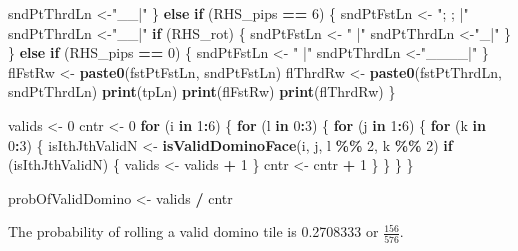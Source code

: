 \documentclass[
]{article}
\newenvironment{Shaded}{\begin{snugshade}}{\end{snugshade}}
\newcommand{\ControlFlowTok}[1]{\textcolor[rgb]{0.13,0.29,0.53}{\textbf{#1}}}
\newcommand{\DecValTok}[1]{\textcolor[rgb]{0.00,0.00,0.81}{#1}}
\newcommand{\FunctionTok}[1]{\textcolor[rgb]{0.13,0.29,0.53}{\textbf{#1}}}
\newcommand{\NormalTok}[1]{#1}
\newcommand{\OtherTok}[1]{\textcolor[rgb]{0.56,0.35,0.01}{#1}}
\newcommand{\SpecialCharTok}[1]{\textcolor[rgb]{0.81,0.36,0.00}{\textbf{#1}}}
\newcommand{\StringTok}[1]{\textcolor[rgb]{0.31,0.60,0.02}{#1}}
\begin{document}
\begin{Shaded}
\begin{Highlighting}[]
\NormalTok{    sndPtThrdLn }\OtherTok{\textless{}{-}}\StringTok{"\textquotesingle{}\_\textquotesingle{}\_|"}
\NormalTok{  \} }\ControlFlowTok{else} \ControlFlowTok{if}\NormalTok{ (RHS\_pips }\SpecialCharTok{==} \DecValTok{6}\NormalTok{) \{}
\NormalTok{    sndPtFstLn }\OtherTok{\textless{}{-}} \StringTok{"; ; |"}
\NormalTok{    sndPtThrdLn }\OtherTok{\textless{}{-}}\StringTok{"\textasciigrave{}\_\textasciigrave{}\_|"}
    \ControlFlowTok{if}\NormalTok{ (RHS\_rot) \{}
\NormalTok{      sndPtFstLn }\OtherTok{\textless{}{-}} \StringTok{"\textquotesingle{}\textquotesingle{}\textquotesingle{} |"}
\NormalTok{      sndPtThrdLn }\OtherTok{\textless{}{-}}\StringTok{"\textquotesingle{}\textquotesingle{}\textquotesingle{}\_|"}
\NormalTok{    \}}
\NormalTok{  \} }\ControlFlowTok{else} \ControlFlowTok{if}\NormalTok{ (RHS\_pips }\SpecialCharTok{==} \DecValTok{0}\NormalTok{) \{}
\NormalTok{    sndPtFstLn }\OtherTok{\textless{}{-}} \StringTok{"    |"}
\NormalTok{    sndPtThrdLn }\OtherTok{\textless{}{-}}\StringTok{"\_\_\_\_|"}
\NormalTok{  \}}
\NormalTok{  flFstRw }\OtherTok{\textless{}{-}} \FunctionTok{paste0}\NormalTok{(fstPtFstLn, sndPtFstLn)}
\NormalTok{  flThrdRw }\OtherTok{\textless{}{-}} \FunctionTok{paste0}\NormalTok{(fstPtThrdLn, sndPtThrdLn)}
  \FunctionTok{print}\NormalTok{(tpLn)}
  \FunctionTok{print}\NormalTok{(flFstRw)}
  \FunctionTok{print}\NormalTok{(flThrdRw)}
\NormalTok{\}}

\NormalTok{valids }\OtherTok{\textless{}{-}} \DecValTok{0}
\NormalTok{cntr }\OtherTok{\textless{}{-}} \DecValTok{0}
\ControlFlowTok{for}\NormalTok{ (i }\ControlFlowTok{in} \DecValTok{1}\SpecialCharTok{:}\DecValTok{6}\NormalTok{) \{}
  \ControlFlowTok{for}\NormalTok{ (l }\ControlFlowTok{in} \DecValTok{0}\SpecialCharTok{:}\DecValTok{3}\NormalTok{) \{}
    \ControlFlowTok{for}\NormalTok{ (j }\ControlFlowTok{in} \DecValTok{1}\SpecialCharTok{:}\DecValTok{6}\NormalTok{) \{}
      \ControlFlowTok{for}\NormalTok{ (k }\ControlFlowTok{in} \DecValTok{0}\SpecialCharTok{:}\DecValTok{3}\NormalTok{) \{}
\NormalTok{        isIthJthValidN }\OtherTok{\textless{}{-}} \FunctionTok{isValidDominoFace}\NormalTok{(i, j, l }\SpecialCharTok{\%\%} \DecValTok{2}\NormalTok{, k }\SpecialCharTok{\%\%} \DecValTok{2}\NormalTok{)}
        \ControlFlowTok{if}\NormalTok{ (isIthJthValidN) \{}
\NormalTok{          valids }\OtherTok{\textless{}{-}}\NormalTok{ valids }\SpecialCharTok{+} \DecValTok{1}
\NormalTok{        \}}
\NormalTok{        cntr }\OtherTok{\textless{}{-}}\NormalTok{ cntr }\SpecialCharTok{+} \DecValTok{1}
\NormalTok{      \}}
\NormalTok{    \}}
\NormalTok{  \}}
\NormalTok{\}}

\NormalTok{probOfValidDomino }\OtherTok{\textless{}{-}}\NormalTok{ valids }\SpecialCharTok{/}\NormalTok{ cntr}
\end{Highlighting}
\end{Shaded}

The probability of rolling a valid domino tile is 0.2708333 or
\(\frac{156}{576}\).
\end{document}

